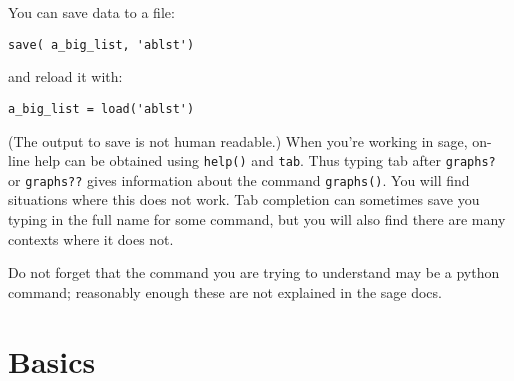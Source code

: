 You can save data to a file:
\begin{center}
    \verb|save( a_big_list, 'ablst')|
\end{center} 
and reload it with: 
\begin{center}
    \verb|a_big_list = load('ablst')|
\end{center}
(The output to save is not human readable.)             
When you're working in sage, on-line help can be obtained using \texttt{help()} 
and \texttt{tab}. Thus typing tab after \texttt{graphs?} or \texttt{graphs??} gives 
information about the command \texttt{graphs()}.  You will find situations where this
does not work.  Tab completion can sometimes save you typing in the full name for
some command, but you will also find there are many contexts where it does not.
                
Do not forget that the command you are trying to understand may be a python
command; reasonably enough these are not explained in the sage docs.

\section{Basics}

